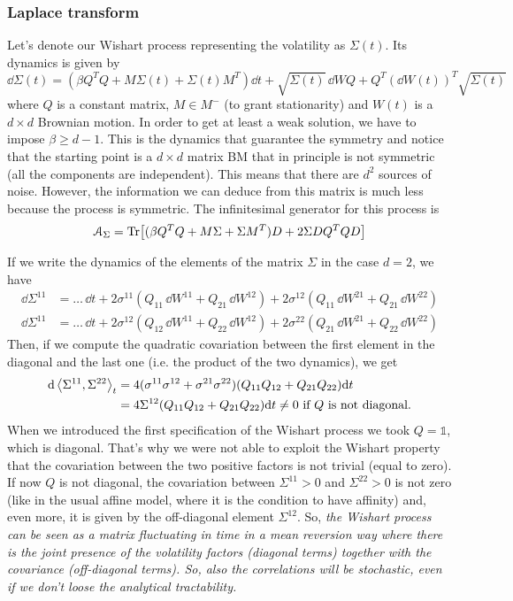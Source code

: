 \subsubsection{Laplace transform}
Let's denote our Wishart process representing the volatility as $\Sigma(t)$. Its dynamics is given by
\begin{equation}
    \dd\Sigma(t) = (\beta Q^TQ + M\Sigma(t) + \Sigma(t)M^T)\dd t + \sqrt{\Sigma(t)}\,\dd WQ + Q^T(\dd W(t))^T\sqrt{\Sigma(t)}
\end{equation}
where $Q$ is a constant matrix, $M\in M^-$ (to grant stationarity) and $W(t)$ is a $d\times d$ Brownian motion. In order to get at least a weak solution, we have to impose $\beta\ge d-1$. This is the dynamics that guarantee the symmetry and notice that the starting point is a $d\times d$ matrix BM that in principle is not symmetric (all the components are independent). This means that there are $d^2$ sources of noise. However, the information we can deduce from this matrix is much less because the process is symmetric. %
The infinitesimal generator for this process is
\begin{equation}
    \mathcal{A}_{\Sigma} = \Tr[(\beta Q^TQ + M\Sigma + \Sigma M^T)D + 2\Sigma DQ^TQD]
\end{equation}
\begin{remark}
    If we write the dynamics of the elements of the matrix $\Sigma$ in the case $d=2$, we have
    \begin{align*}
        \dd\Sigma^{11} &= \dots\,\dd t + 2\sigma^{11}(Q_{11}\,\dd W^{11} + Q_{21}\,\dd W^{12}) + 2\sigma^{12}(Q_{11}\,\dd W^{21}+Q_{21}\,\dd W^{22}) \\
        \dd\Sigma^{11} &= \dots\,\dd t + 2\sigma^{12}(Q_{12}\,\dd W^{11} + Q_{22}\,\dd W^{12}) + 2\sigma^{22}(Q_{21}\,\dd W^{21}+Q_{22}\,\dd W^{22})
    \end{align*}
    Then, if we compute the quadratic covariation between the first element in the diagonal and the last one (i.e. the product of the two dynamics), we get
    \begin{align*}
        \dd\expval{\Sigma^{11},\Sigma^{22}}_t &= 4(\sigma^{11}\sigma^{12} + \sigma^{21}\sigma^{22})(Q_{11}Q_{12} + Q_{21}Q_{22})\dd t \\
        &=
        4\Sigma^{12}(Q_{11}Q_{12} + Q_{21}Q_{22})\dd t \ne 0 \text{  if $Q$ is not diagonal.}
    \end{align*}
    When we introduced the first specification of the Wishart process we took $Q = \mathds{1}$, which is diagonal. That's why we were not able to exploit the Wishart property that the covariation between the two positive factors is not trivial (equal to zero). If now $Q$ is not diagonal, the covariation between $\Sigma^{11}>0$ and $\Sigma^{22}>0$ is not zero (like in the usual affine model, where it is the condition to have affinity) and, even more, it is given by the off-diagonal element $\Sigma^{12}$. So, \emph{the Wishart process can be seen as a matrix fluctuating in time in a mean reversion way where there is the joint presence of the volatility factors (diagonal terms) together with the covariance (off-diagonal terms). So, also the correlations will be stochastic, even if we don't loose the analytical tractability.}
\end{remark}
